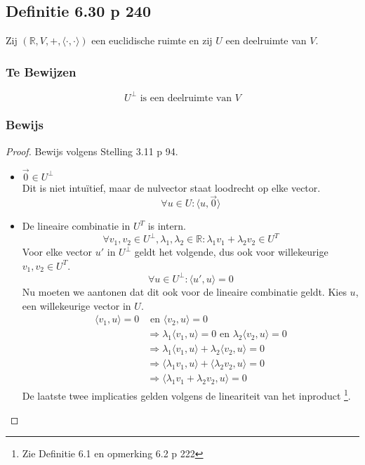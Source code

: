 \documentclass[lineaire_algebra_oplossingen.tex]{subfiles}
\begin{document}
\subsection{Definitie 6.30 p 240}
\label{6.30}
Zij $(\mathbb{R}, V,+, \langle \cdot,\cdot \rangle)$ een euclidische ruimte en zij $U$ een deelruimte van $V$.

\subsubsection*{Te Bewijzen}
\[
U^\bot \text{ is een deelruimte van } V
\]

\subsubsection*{Bewijs}
\begin{proof}
Bewijs volgens Stelling 3.11 p 94.
\begin{itemize}
\item $\vec{0} \in U^\bot$\\
Dit is niet intu\"itief, maar de nulvector staat loodrecht op elke vector.
\[
\forall u \in U: \langle u, \vec{0} \rangle
\]

\item De lineaire combinatie in $U^T$ is intern.
\[
\forall v_1,v_2\in U^\bot, \lambda_1,\lambda_2 \in \mathbb{R} : \lambda_1v_1 + \lambda_2v_2 \in U^T
\]
Voor elke vector $u'$ in $U^\bot$ geldt het volgende, dus ook voor willekeurige $v_1,v_2\in U^T$.
\[
\forall u\in U^\bot: \langle u',u\rangle = 0
\]
Nu moeten we aantonen dat dit ook voor de lineaire combinatie geldt. Kies $u$, een willekeurige vector in $U$.
\begin{align*}
\langle v_1,u\rangle = 0 &\text{ en } \langle v_2,u\rangle = 0 \\
& \Longrightarrow
\lambda_1\langle v_1,u\rangle = 0 \text{ en } \lambda_2\langle v_2,u\rangle = 0 \\
& \Longrightarrow
\lambda_1\langle v_1,u\rangle + \lambda_2\langle v_2,u\rangle = 0 \\
& \Longrightarrow
\langle \lambda_1v_1,u\rangle + \langle \lambda_2v_2,u\rangle = 0 \\
& \Longrightarrow
\langle \lambda_1v_1 + \lambda_2v_2,u\rangle = 0
\end{align*}
De laatste twee implicaties gelden volgens de lineariteit van het inproduct \footnote{Zie Definitie 6.1 en opmerking 6.2 p 222}.
\end{itemize}
\end{proof}
\end{document}

